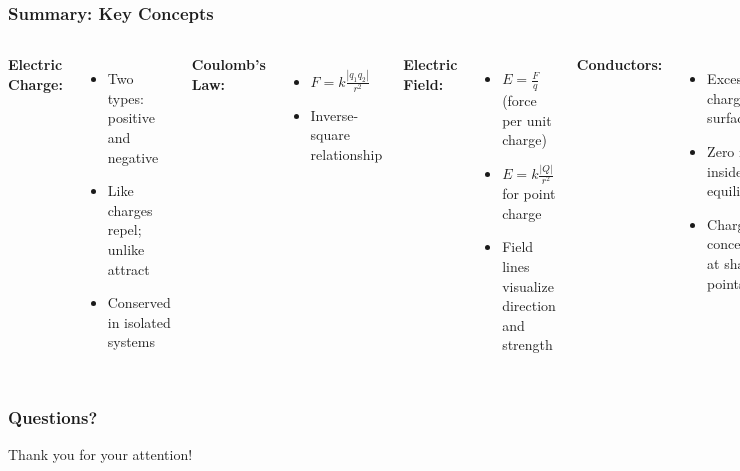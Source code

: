 \documentclass{beamer}
\newcommand{\highlight}[1]{\textcolor{ds9red}{#1}}
\begin{document}
\begin{frame}
    \frametitle{Summary: Key Concepts}
    
    \begin{columns}[t]
        \textbf{Electric Charge:}
        \begin{itemize}
            \item Two types: positive and negative
            \item Like charges repel; unlike attract
            \item Conserved in isolated systems
        \end{itemize}
        
        \textbf{Coulomb's Law:}
        \begin{itemize}
            \item $F = k\frac{|q_1 q_2|}{r^2}$
            \item Inverse-square relationship
        \end{itemize}
        
        \textbf{Electric Field:}
        \begin{itemize}
            \item $E = \frac{F}{q}$ (force per unit charge)
            \item $E = k\frac{|Q|}{r^2}$ for point charge
            \item Field lines visualize direction and strength
        \end{itemize}
        
        \textbf{Conductors:}
        \begin{itemize}
            \item Excess charge on surface
            \item Zero field inside at equilibrium
            \item Charge concentrates at sharp points
        \end{itemize}
    \end{columns}
    
    
\end{frame}

\begin{frame}
    \frametitle{Questions?}
    
    \begin{center}
        \Large{\highlight{Thank you for your attention!}}
        
        
    \end{center}
\end{frame}
\end{document}
